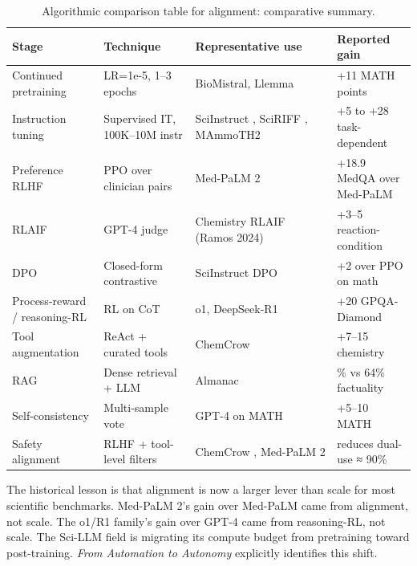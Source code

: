 \documentclass{article}
\begin{document}
\begin{table}[t]
\centering
\caption{Algorithmic comparison table for alignment: comparative summary.}
\label{tab:algorithmic-comparison-table-for-alignment}
\begin{tabular}{>{\raggedright\arraybackslash}p{0.2283\linewidth}
  >{\raggedright\arraybackslash}p{0.2283\linewidth}
  >{\raggedright\arraybackslash}p{0.3465\linewidth}
  >{\raggedright\arraybackslash}p{0.1969\linewidth}}
\toprule
Stage & Technique & Representative use & Reported gain \\
\midrule
Continued pretraining & LR=1e-5, 1--3 epochs & BioMistral, Llemma \cite{azerbayev2023llemmaanopenlangua} & +11 MATH points \\
Instruction tuning & Supervised IT, 100K--10M instr & SciInstruct \cite{zhang2024sciinstructaselfre}, SciRIFF \cite{wadden2024sciriffaresourceto}, MAmmoTH2 \cite{yue2024mammoth2scalingins} & +5 to +28 task-dependent \\
Preference RLHF & PPO over clinician pairs & Med-PaLM 2 \cite{singhal2025towardexpertlevelm} & +18.9 MedQA over Med-PaLM \\
RLAIF & GPT-4 judge & Chemistry RLAIF (Ramos 2024) \cite{ramos2024chemicalscience202} & +3--5 reaction-condition \\
DPO & Closed-form contrastive & SciInstruct DPO \cite{zhang2024sciinstructaselfre} & +2 over PPO on math \\
Process-reward / reasoning-RL & RL on CoT & o1, DeepSeek-R1 & +20 GPQA-Diamond \\
Tool augmentation & ReAct + curated tools & ChemCrow \cite{bran2024naturemachineintel} & +7--15 chemistry \\
RAG & Dense retrieval + LLM & Almanac \cite{zakka2024almanacretrievalau} & 91\% vs 64\% factuality \\
Self-consistency & Multi-sample vote & GPT-4 on MATH & +5--10 MATH \\
Safety alignment & RLHF + tool-level filters & ChemCrow \cite{bran2024naturemachineintel}, Med-PaLM 2 \cite{singhal2025towardexpertlevelm} & reduces dual-use ≈ 90\% \\
\end{tabular}
\end{table}

The historical lesson is that alignment is now a larger lever than scale for most scientific benchmarks. Med-PaLM 2's gain over Med-PaLM came from alignment, not scale. The o1/R1 family's gain over GPT-4 came from reasoning-RL, not scale. The Sci-LLM field is migrating its compute budget from pretraining toward post-training. \emph{From Automation to Autonomy} \cite{zheng2025fromautomationtoau} explicitly identifies this shift.
\end{document}
